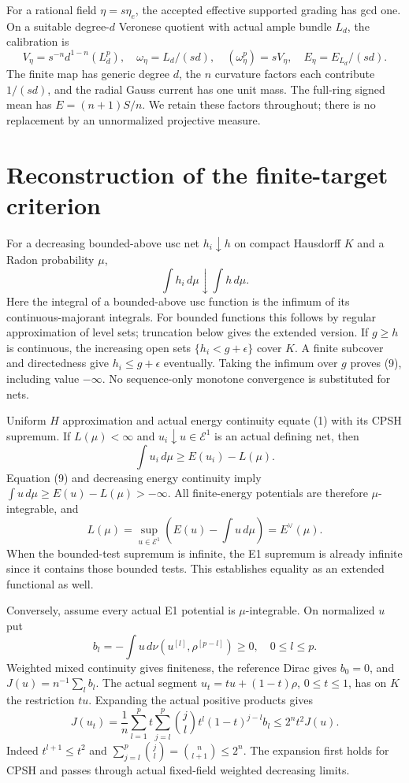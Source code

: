 \documentclass[
  10pt,
]{article}
\begin{document}
For a rational field \(\eta=s\eta_e\), the accepted effective supported
grading has gcd one. On a suitable degree-\(d\) Veronese quotient with
actual ample bundle \(L_d\), the calibration is \[
 V_\eta=s^{-n}d^{1-n}(L_d^p),\quad \omega_\eta=L_d/(sd),\quad
 (\omega_\eta^p)=sV_\eta,\quad E_\eta=E_{L_d}/(sd). \tag{8}
\] The finite map has generic degree \(d\), the \(n\) curvature factors
each contribute \(1/(sd)\), and the radial Gauss current has one unit
mass. The full-ring signed mean has \(E=(n+1)S/n\). We retain these
factors throughout; there is no replacement by an unnormalized
projective measure.

\section{Reconstruction of the finite-target
criterion}\label{reconstruction-of-the-finite-target-criterion}

For a decreasing bounded-above usc net \(h_i\downarrow h\) on compact
Hausdorff \(K\) and a Radon probability \(\mu\),
\[\int h_i\,d\mu\downarrow\int h\,d\mu. \tag{9}\] Here the integral of a
bounded-above usc function is the infimum of its continuous-majorant
integrals. For bounded functions this follows by regular approximation
of level sets; truncation below gives the extended version. If
\(g\ge h\) is continuous, the increasing open sets
\(\{h_i<g+\epsilon\}\) cover \(K\). A finite subcover and directedness
give \(h_i\le g+\epsilon\) eventually. Taking the infimum over \(g\)
proves (9), including value \(-\infty\). No sequence-only monotone
convergence is substituted for nets.

Uniform \(H\) approximation and actual energy continuity equate (1) with
its CPSH supremum. If \(L(\mu)<\infty\) and
\(u_i\downarrow u\in\mathcal E^1\) is an actual defining net, then
\[\int u_i\,d\mu\ge E(u_i)-L(\mu).\] Equation (9) and decreasing energy
continuity imply \(\int u\,d\mu\ge E(u)-L(\mu)>-\infty\). All
finite-energy potentials are therefore \(\mu\)-integrable, and \[
 L(\mu)=\sup_{u\in\mathcal E^1}\left(E(u)-\int u\,d\mu\right)=E^\vee(\mu).
 \tag{10}
\] When the bounded-test supremum is infinite, the E1 supremum is
already infinite since it contains those bounded tests. This establishes
equality as an extended functional as well.

Conversely, assume every actual E1 potential is \(\mu\)-integrable. On
normalized \(u\) put
\[b_l=-\int u\,d\nu(u^{[l]},\rho^{[p-l]})\ge0,\quad 0\le l\le p.\]
Weighted mixed continuity gives finiteness, the reference Dirac gives
\(b_0=0\), and \(J(u)=n^{-1}\sum_l b_l\). The actual segment
\(u_t=tu+(1-t)\rho\), \(0\le t\le1\), has on \(K\) the restriction
\(tu\). Expanding the actual positive products gives \[
 J(u_t)=\frac1n\sum_{l=1}^p
 t\sum_{j=l}^p{j\choose l}t^l(1-t)^{j-l}b_l
 \le2^nt^2J(u). \tag{11}
\] Indeed \(t^{l+1}\le t^2\) and
\(\sum_{j=l}^p{j\choose l}={n\choose l+1}\le2^n\). The expansion first
holds for CPSH and passes through actual fixed-field weighted decreasing
limits.
\end{document}

